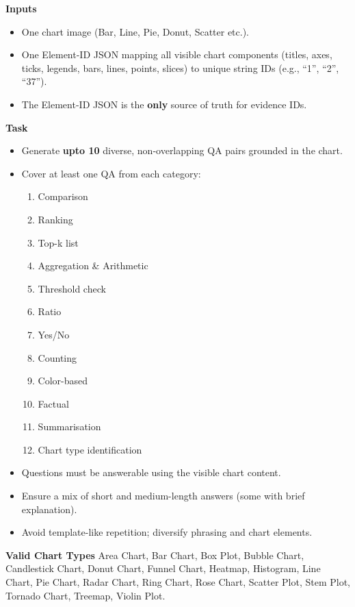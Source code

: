 \begin{tcolorbox}[myprompt, title=Chart QA Prompt --- Input \& Task Specification]

    \textbf{Inputs}
    \begin{itemize}
      \item One chart image (Bar, Line, Pie, Donut, Scatter etc.).
      \item One Element-ID JSON mapping all visible chart components 
            (titles, axes, ticks, legends, bars, lines, points, slices) 
            to unique string IDs (e.g., ``1'', ``2'', ``37'').
      \item The Element-ID JSON is the \textbf{only} source of truth for evidence IDs.
    \end{itemize}
    
    \medskip
    \textbf{Task}
    \begin{itemize}
      \item Generate \textbf{upto 10} diverse, non-overlapping QA pairs grounded in the chart.
      \item Cover at least one QA from each category:
      \begin{enumerate}
        \item Comparison
        \item Ranking
        \item Top-k list
        \item Aggregation \& Arithmetic
        \item Threshold check
        \item Ratio
        \item Yes/No
        \item Counting
        \item Color-based
        \item Factual
        \item Summarisation
        \item Chart type identification
      \end{enumerate}
      \item Questions must be answerable using the visible chart content.
      \item Ensure a mix of short and medium-length answers (some with brief explanation).
      \item Avoid template-like repetition; diversify phrasing and chart elements.
    \end{itemize}
    
    \medskip
    \textbf{Valid Chart Types}
    \noindent\small
    Area Chart, Bar Chart, Box Plot, Bubble Chart, Candlestick Chart,
    Donut Chart, Funnel Chart, Heatmap, Histogram,
    Line Chart, Pie Chart,
    Radar Chart, Ring Chart, Rose Chart, Scatter Plot,  Stem Plot, Tornado Chart, Treemap, Violin Plot.
    
\end{tcolorbox}

